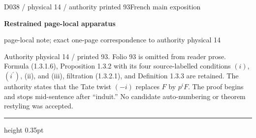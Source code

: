 \documentclass[9pt]{article}
\newcommand{\CanonText}[1]{\par{\fontsize{8.0}{9.35}\selectfont\RaggedRight #1\par}\vspace{2.2pt}}
\newcommand{\LayerTitle}{Restrained page-local apparatus}
\begin{document}
\noindent\begin{minipage}[t][\dimexpr\textheight-5pt\relax][t]{\textwidth}
{\sffamily\fontsize{7.3}{8.2}\selectfont\color{Quiet} D038 / physical 14 / authority printed 93\hfill French main exposition}
\par{}\vspace{4.5pt}
{\sffamily\fontsize{10.4}{11.6}\selectfont\bfseries\color{Accent} \LayerTitle}
\par{\sffamily\fontsize{6.7}{7.7}\selectfont\color{Quiet} page-local note; exact one-page correspondence to authority physical 14}
\vspace{5pt}
\CanonText{Authority physical 14 / printed 93. Folio 93 is omitted from reader prose. Formula (1.3.1.6), Proposition 1.3.2 with its four source-labelled conditions \((i)\), \((i^{\prime})\), (ii), and (iii), filtration (1.3.2.1), and Definition 1.3.3 are retained. The authority states that the Tate twist \((-i)\) replaces \(F\) by \(p^{i}F\). The proof begins and stops mid-sentence after “induit.” No candidate auto-numbering or theorem restyling was accepted.}
\vfill
{\color{Accent}\hrule height 0.35pt}\vspace{3pt}
\end{minipage}
\newpage
\end{document}
